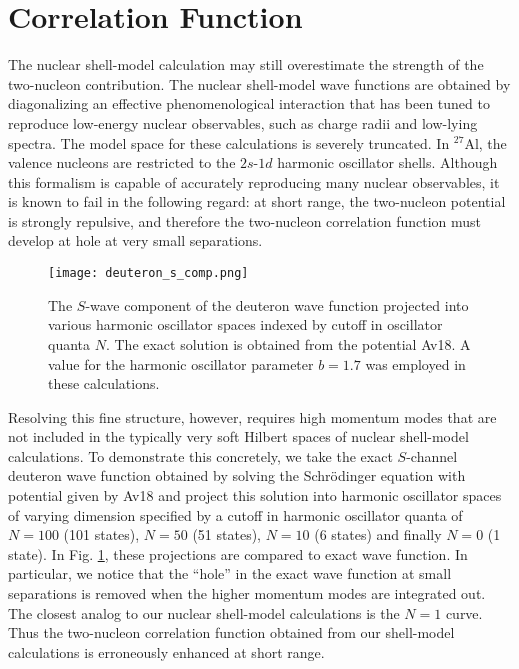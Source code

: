 \documentclass{book}[letterpaper,12pt]
\begin{document}
\section{Correlation Function}
\label{sec:cor_fun}
The nuclear shell-model calculation may still overestimate the strength of the two-nucleon contribution. The nuclear shell-model wave functions are obtained by diagonalizing an effective phenomenological interaction that has been tuned to reproduce low-energy nuclear observables, such as charge radii and low-lying spectra. The model space for these calculations is severely truncated. In $^{27}$Al, the valence nucleons are restricted to the $2s$-$1d$ harmonic oscillator shells. Although this formalism is capable of accurately reproducing many nuclear observables, it is known to fail in the following regard: at short range, the two-nucleon potential is strongly repulsive, and therefore the two-nucleon correlation function must develop at hole at very small separations.

\begin{figure}
\centering
\texttt{[image: deuteron\_s\_comp.png]}
\caption{The $S$-wave component of the deuteron wave function projected into various harmonic oscillator spaces indexed by cutoff in oscillator quanta $N$. The exact solution is obtained from the potential Av18. A value for the harmonic oscillator parameter $b=1.7$ was employed in these calculations.}
\label{fig:deuteron_proj}
\end{figure}

Resolving this fine structure, however, requires high momentum modes that are not included in the typically very soft Hilbert spaces of nuclear shell-model calculations. To demonstrate this concretely, we take the exact $S$-channel deuteron wave function obtained by solving the Schr\"odinger equation with potential given by Av18\cite{PhysRevC.51.38} and project this solution into harmonic oscillator spaces of varying dimension specified by a cutoff in harmonic oscillator quanta of $N=100$ (101 states), $N=50$ (51 states), $N=10$ (6 states) and finally $N=0$ (1 state). In Fig. \ref{fig:deuteron_proj}, these projections are compared to exact wave function. In particular, we notice that the ``hole'' in the exact wave function at small separations is removed when the higher momentum modes are integrated out. The closest analog to our nuclear shell-model calculations is the $N=1$ curve. Thus the two-nucleon correlation function obtained from our shell-model calculations is erroneously enhanced at short range.
\end{document}
